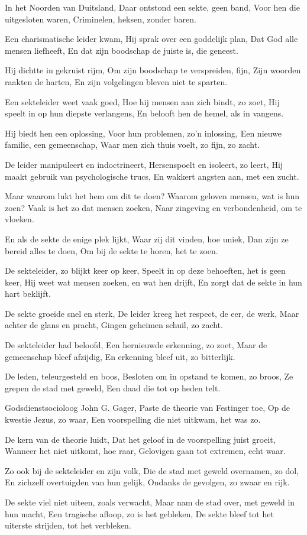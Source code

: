 In het Noorden van Duitsland,
Daar ontstond een sekte, geen band,
Voor hen die uitgesloten waren,
Criminelen, heksen, zonder baren.

Een charismatische leider kwam,
Hij sprak over een goddelijk plan,
Dat God alle mensen liefheeft,
En dat zijn boodschap de juiste is, die geneest.

Hij dichtte in gekruist rijm,
Om zijn boodschap te verspreiden, fijn,
Zijn woorden raakten de harten,
En zijn volgelingen bleven niet te sparten.

Een sekteleider weet vaak goed,
Hoe hij mensen aan zich bindt, zo zoet,
Hij speelt in op hun diepste verlangens,
En belooft hen de hemel, als in vangens.

Hij biedt hen een oplossing,
Voor hun problemen, zo'n inlossing,
Een nieuwe familie, een gemeenschap,
Waar men zich thuis voelt, zo fijn, zo zacht.

De leider manipuleert en indoctrineert,
Hersenspoelt en isoleert, zo leert,
Hij maakt gebruik van psychologische trucs,
En wakkert angsten aan, met een zucht.

Maar waarom lukt het hem om dit te doen?
Waarom geloven mensen, wat is hun zoen?
Vaak is het zo dat mensen zoeken,
Naar zingeving en verbondenheid, om te vloeken.

En als de sekte de enige plek lijkt,
Waar zij dit vinden, hoe uniek,
Dan zijn ze bereid alles te doen,
Om bij de sekte te horen, het te zoen.

De sekteleider, zo blijkt keer op keer,
Speelt in op deze behoeften, het is geen keer,
Hij weet wat mensen zoeken, en wat hen drijft,
En zorgt dat de sekte in hun hart beklijft.

De sekte groeide snel en sterk,
De leider kreeg het respect, de eer, de werk,
Maar achter de glans en pracht,
Gingen geheimen schuil, zo zacht.

De sekteleider had beloofd,
Een hernieuwde erkenning, zo zoet,
Maar de gemeenschap bleef afzijdig,
En erkenning bleef uit, zo bitterlijk.

De leden, teleurgesteld en boos,
Besloten om in opstand te komen, zo broos,
Ze grepen de stad met geweld,
Een daad die tot op heden telt.

Godsdienstsocioloog John G. Gager,
Paste de theorie van Festinger toe,
Op de kwestie Jezus, zo waar,
Een voorspelling die niet uitkwam, het was zo.

De kern van de theorie luidt,
Dat het geloof in de voorspelling juist groeit,
Wanneer het niet uitkomt, hoe raar,
Gelovigen gaan tot extremen, echt waar.

Zo ook bij de sekteleider en zijn volk,
Die de stad met geweld overnamen, zo dol,
En zichzelf overtuigden van hun gelijk,
Ondanks de gevolgen, zo zwaar en rijk.

De sekte viel niet uiteen, zoals verwacht,
Maar nam de stad over, met geweld in hun macht,
Een tragische afloop, zo is het gebleken,
De sekte bleef tot het uiterste strijden, tot het verbleken.
